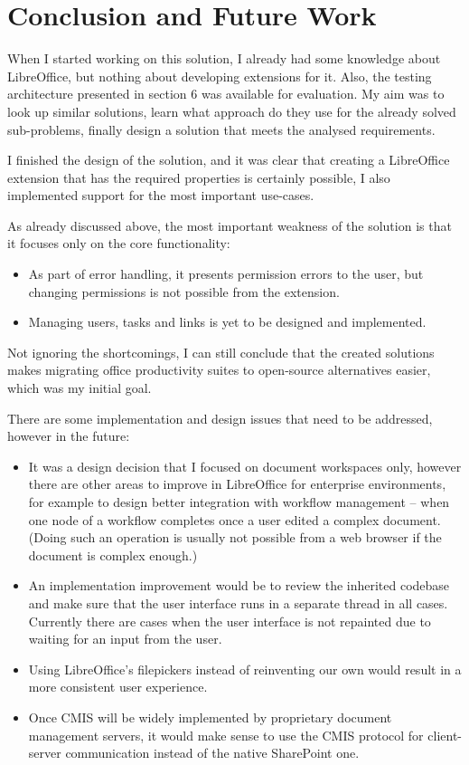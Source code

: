 \section{Conclusion and Future Work}

When I started working on this solution, I already had some knowledge about
LibreOffice, but nothing about developing extensions for it. Also, the testing
architecture presented in section 6 was available for evaluation. My aim was to
look up similar solutions, learn what approach do they use for the already
solved sub-problems, finally design a solution that meets the analysed
requirements.

I finished the design of the solution, and it was clear that creating a
LibreOffice extension that has the required properties is certainly possible,
I also implemented support for the most important use-cases.

As already discussed above, the most important weakness of the solution is that
it focuses only on the core functionality:

\begin{itemize}
\item As part of error handling, it presents permission errors to the user, but
changing permissions is not possible from the extension.
\item Managing users, tasks and links is yet to be designed and implemented.
\end{itemize}

Not ignoring the shortcomings, I can still conclude that the created solutions
makes migrating office productivity suites to open-source alternatives easier,
which was my initial goal.

There are some implementation and design issues that need to be addressed,
however in the future:

\begin{itemize}
\item It was a design decision that I focused on document workspaces only,
however there are other areas to improve in LibreOffice for enterprise
environments, for example to design better integration with workflow management
-- when one node of a workflow completes once a user edited a complex document.
(Doing such an operation is usually not possible from a web browser if the
document is complex enough.)
\item An implementation improvement would be to review the inherited codebase
and make sure that the user interface runs in a separate thread in all cases.
Currently there are cases when the user interface is not repainted due to
waiting for an input from the user.
\item Using LibreOffice's filepickers instead of reinventing our own would
result in a more consistent user experience.
\item Once CMIS will be widely implemented by proprietary document management
servers, it would make sense to use the CMIS protocol for client-server
communication instead of the native SharePoint one.
\end{itemize}

